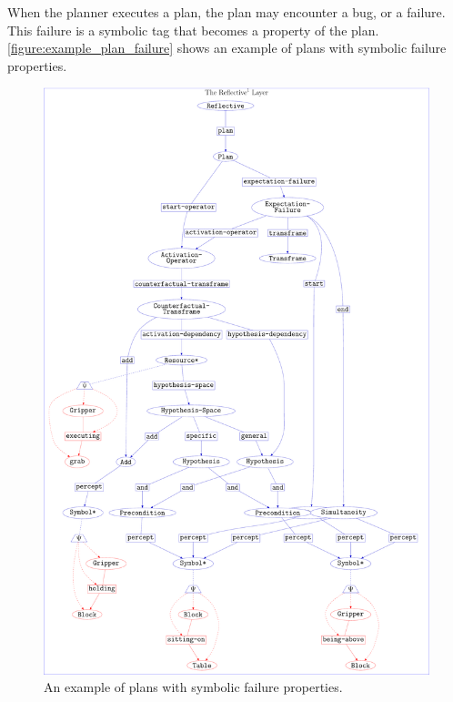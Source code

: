 When the planner executes a plan, the plan may encounter a bug, or a
failure.  This failure is a symbolic tag that becomes a property of
the plan.  {\mbox{\autoref{figure:example_plan_failure}}} shows an
example of plans with symbolic failure properties.
\begin{figure}
\includegraphics[width=12cm]{gfx/example_plan_failure}
\caption[An example of plans with symbolic failure properties.]{An
  example of plans with symbolic failure properties.}
\label{figure:example_plan_failure}
\end{figure}

%


